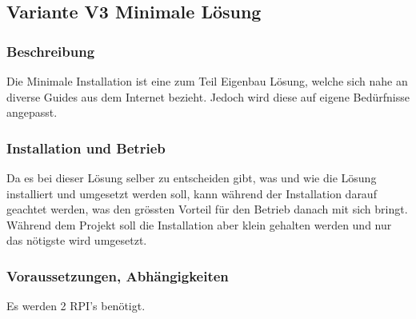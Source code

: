 \subsection{Variante V3 \flqq Minimale Lösung\frqq}
\subsubsection{Beschreibung}
Die Minimale Installation ist eine zum Teil Eigenbau Lösung, welche sich nahe an diverse Guides aus dem Internet bezieht. Jedoch wird diese auf eigene Bedürfnisse angepasst.

\subsubsection{Installation und Betrieb}
Da es bei dieser Lösung selber zu entscheiden gibt, was und wie die Lösung installiert und umgesetzt werden soll, kann während der Installation darauf geachtet werden, was den grössten Vorteil für den Betrieb danach mit sich bringt. Während dem Projekt soll die Installation aber klein gehalten werden und nur das nötigste wird umgesetzt. 

\subsubsection{Voraussetzungen, Abhängigkeiten}
Es werden 2 RPI's benötigt.